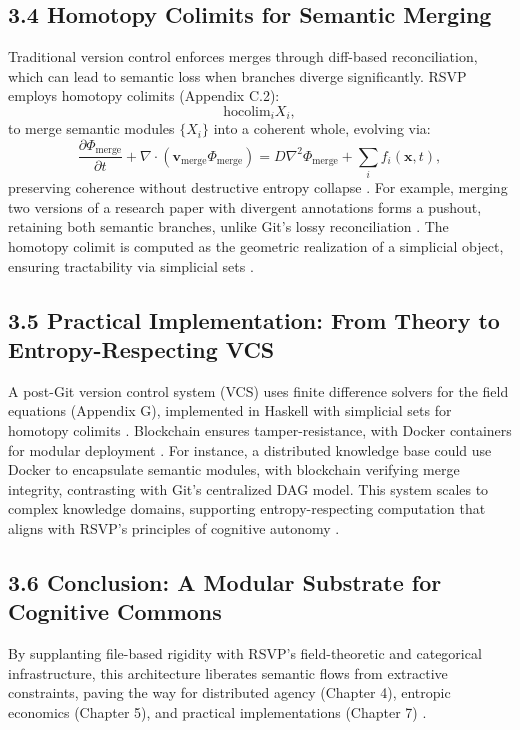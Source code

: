 \documentclass[12pt]{article}
\begin{document}
\subsection*{3.4 Homotopy Colimits for Semantic Merging}
Traditional version control enforces merges through diff-based reconciliation, which can lead to semantic loss when branches diverge significantly. RSVP employs homotopy colimits (Appendix C.2):
\[
\text{hocolim}_i X_i,
\]
to merge semantic modules \(\{X_i\}\) into a coherent whole, evolving via:
\[
\frac{\partial \Phi_{\text{merge}}}{\partial t} + \nabla \cdot (\mathbf{v}_{\text{merge}} \Phi_{\text{merge}}) = D \nabla^2 \Phi_{\text{merge}} + \sum_i f_i(\mathbf{x}, t),
\]
preserving coherence without destructive entropy collapse \citep{hatcher2002}. For example, merging two versions of a research paper with divergent annotations forms a pushout, retaining both semantic branches, unlike Git's lossy reconciliation \citep{milewski2018}. The homotopy colimit is computed as the geometric realization of a simplicial object, ensuring tractability via simplicial sets \citep{may1999}.

\subsection*{3.5 Practical Implementation: From Theory to Entropy-Respecting VCS}
A post-Git version control system (VCS) uses finite difference solvers for the field equations (Appendix G), implemented in Haskell with simplicial sets for homotopy colimits \citep{milewski2018}. Blockchain ensures tamper-resistance, with Docker containers for modular deployment \citep{bird1988}. For instance, a distributed knowledge base could use Docker to encapsulate semantic modules, with blockchain verifying merge integrity, contrasting with Git's centralized DAG model. This system scales to complex knowledge domains, supporting entropy-respecting computation that aligns with RSVP's principles of cognitive autonomy \citep{whitehead1978}.

\subsection*{3.6 Conclusion: A Modular Substrate for Cognitive Commons}
By supplanting file-based rigidity with RSVP's field-theoretic and categorical infrastructure, this architecture liberates semantic flows from extractive constraints, paving the way for distributed agency (Chapter 4), entropic economics (Chapter 5), and practical implementations (Chapter 7) \citep{deleuze1987, whitehead1978}.
\end{document}
